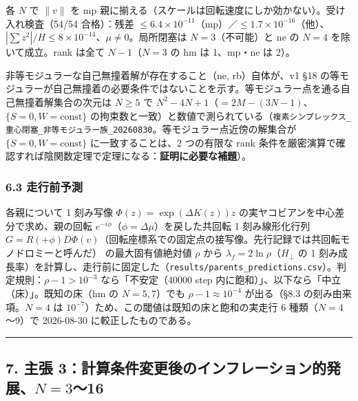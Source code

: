 \documentclass[
  10pt,
  a4paper,
]{ltjsarticle}
\begin{document}
各 \(N\) で \(\|v\|\) を mp
親に揃える（スケールは回転速度にしか効かない）。受け入れ検査（54/54
合格）：残差
\(\le6.4\times10^{-11}\)（mp）／\(\le1.7\times10^{-16}\)（他）、\(|\sum z^2|/H\le8\times10^{-14}\)、\(\mu\ne0\)。局所閉塞は
\(N=3\)（不可能）と ne の \(N=4\) を除いて成立。rank は全て
\(N-1\)（\(N=3\) の hm は 1、mp・ne は 2）。

非等モジュラーな自己無撞着解が存在すること（ne, rb）自体が、v1 §18
の等モジュラーが自己無撞着の必要条件ではないことを示す。等モジュラー点を通る自己無撞着解集合の次元は
\(N\ge5\) で \(N^2-4N+1\)（\(=2M-(3N-1)\)、\(\{S=0,W=\text{const}\}\)
の拘束数と一致）と数値で測られている（\texttt{複素シンプレックス\_重心閉塞\_非等モジュラー族\_20260830}。等モジュラー点近傍の解集合が
\(\{S=0,W=\text{const}\}\) に一致することは、2 つの有限な rank
条件を厳密演算で確認すれば陰関数定理で定理になる：\textbf{証明に必要な補題}）。

\subsubsection{6.3 走行前予測}\label{ux8d70ux884cux524dux4e88ux6e2c}

各親について 1 刻み写像 \(\Phi(z)=\exp(\Delta K(z))z\)
の実ヤコビアンを中心差分で求め、親の回転
\(e^{-i\phi}\)（\(\phi=\Delta\mu\)）を戻した共回転 1 刻み線形化行列
\(G=R(+\phi)D\Phi(v)\)（回転座標系での固定点の接写像。先行記録では共回転モノドロミーと呼んだ）
の最大固有値絶対値 \(\rho\) から \(\lambda_f=2\ln\rho\)（\(H_\perp\) の
1
刻み成長率）を計算し、走行前に固定した（\texttt{results/parents\_predictions.csv}）。判定規則：\(\rho-1>10^{-3}\)
なら「不安定（40000 step
内に飽和）」、以下なら「中立（床）」。既知の床（hm の \(N=5,7\)）でも
\(\rho-1\approx10^{-4}\) が出る（§8.3 の刻み由来項。\(N=4\) は
\(10^{-7}\)）ため、この閾値は既知の床と飽和の実走行 6
種類（\(N=4\)〜9）で 2026-08-30 に較正したものである。

\begin{center}\rule{0.5\linewidth}{0.5pt}\end{center}

\subsection{\texorpdfstring{7. 主張
3：計算条件変更後のインフレーション的発展、\(N=3\)〜16}{7. 主張 3：計算条件変更後のインフレーション的発展、N=3〜16}}\label{ux4e3bux5f35-3ux8a08ux7b97ux6761ux4ef6ux5909ux66f4ux5f8cux306eux30a4ux30f3ux30d5ux30ecux30fcux30b7ux30e7ux30f3ux7684ux767aux5c55n316}
\end{document}
